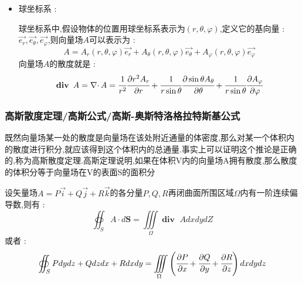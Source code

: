 \documentclass[UTF8,12pt]{ctexbook}
\newcommand{\partialDerivativeFrac}[2]{\cfrac{\partial #1}{\partial #2}}
\newcommand{\tripleIntegralOnZone}[1]{\iiint\limits_{#1}}
\newcommand{\doubleCurveIntegralOnZone}[1]{\oiint_{#1}}
\DeclareMathOperator{\divergenceText}{\mathbf{div}\ }
\DeclareMathOperator{\divergenceSymbol}{\nabla\cdot}
\begin{document}
{{{{{\begin{itemize}
{              圆柱坐标系中,假设物体的位置为$(\rho,\varphi,z)$,定义其径向单位矢量,横向单位的矢量和纵向单位的矢量为

              $\vec{e_{\rho}},\vec{e_{\varPhi}},\vec{e_z}$,那么向量场$A$可以表示为 :
              $$
                A = A_{\rho}(\rho,\varphi,z)\vec{e_{\rho}} + A_{\varphi}(\rho,\varphi,z)\vec{e_{\varphi}} + A_{z}(\rho,\varphi,z)\vec{e_{z}}
              $$
              向量场$A$的散度就是 :
              $$
                \divergenceText A = \divergenceSymbol A = \cfrac{1}{\rho}\partialDerivativeFrac{\rho A_\rho}{\rho} + \cfrac{1}{\rho}\partialDerivativeFrac{A_\varphi}{\varphi} + \partialDerivativeFrac{A_z}{z}
              $$
              }
        \item {
              球坐标系 :

              球坐标系中,假设物体的位置用球坐标系表示为$(r,\theta,\varphi)$,定义它的基向量 : $\vec{e_r},\vec{e_\theta},\vec{e_\varphi}$,则向量场$A$可以表示为 :
              $$
                A = A_r(r,\theta,\varphi)\vec{e_r} + A_\theta(r,\theta,\varphi)\vec{e_\theta} + A_\varphi(r,\theta,\varphi)\vec{e_\varphi}
              $$
              向量场$A$的散度就是 :
              $$
                \divergenceText A = \divergenceSymbol A = \cfrac{1}{r^2}\partialDerivativeFrac{r^2A_r}{r} + \cfrac{1}{r\sin\theta}\partialDerivativeFrac{\sin\theta A_\theta}{\theta} + \cfrac{1}{r\sin\theta}\partialDerivativeFrac{A_\varphi}{\varphi}
              $$
              }
      \end{itemize}
    }%

    \subsubsection{高斯散度定理/高斯公式/高斯-奥斯特洛格拉特斯基公式}{
      既然向量场某一处的散度是向量场在该处附近通量的体密度,那么对某一个体积内的散度进行积分,就应该得到这个体积内的总通量.事实上可以证明这个推论是正确的,称为高斯散度定理.高斯定理说明,如果在体积V内的向量场A拥有散度,那么散度的体积分等于向量场在V的表面S的面积分

      设矢量场$A = P\vec{i} + Q\vec{j} + R\vec{k}$的各分量$P,Q,R$再闭曲面所围区域$\Omega$内有一阶连续偏导数,则有 :
      $$
        \doubleCurveIntegralOnZone{S}A \cdot d\mathbf{S} = \tripleIntegralOnZone{\Omega}\divergenceText AdxdydZ
      $$
      或者 :
      $$
        \doubleCurveIntegralOnZone{S}Pdydz + Qdzdx + Rdxdy = \tripleIntegralOnZone{\Omega}\left(\partialDerivativeFrac{P}{x} + \partialDerivativeFrac{Q}{y} + \partialDerivativeFrac{R}{z}\right)dxdydz
      $$

}}}}}
\end{document}
